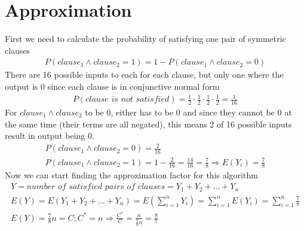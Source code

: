 \documentclass[12pt]{article}
\begin{document}
\section{Approximation}
	First we need to calculate the probability of satisfying one pair of symmetric clauses
	\begin{gather*}
	P(clause_1 \land clause_2 = 1) = 1 - P(clause_1 \land clause_2 = 0)
	\end{gather*}
	There are 16 possible inputs to each for each clause, but only one where the output is 0 since each clause is in conjunctive normal form
	\begin{gather*}
	P(\textit{clause is not satisfied}) = \frac{1}{2} \cdot \frac{1}{2} \cdot \frac{1}{2} \cdot \frac{1}{2} = \frac{1}{16}
	\end{gather*}
	For $clause_1 \land clause_2$ to be 0, either has to be 0 and since they cannot be 0 at
	the same time (their terms are all negated), this means 2 of 16 possible inputs result in output being 0.
	\begin{gather*}
	P(clause_1 \land clause_2 = 0) = \frac{2}{16}\\
	P(clause_1 \land clause_2 = 1) = 1 - \frac{2}{16} = \frac{14}{16} = \frac{7}{8} \Rightarrow E(Y_i) = \frac{7}{8}
	\end{gather*}
	Now we can start finding the approximation factor for this algorithm
	\begin{gather*}
	Y = \textit{number of satisfied pairs of clauses} = Y_1 + Y_2 + \dots + Y_n \\
	E(Y) = E(Y_1 + Y_2 + \dots + Y_n) = E(\sum_{i=1}^{n}{Y_i}) = \sum_{i=1}^{n}{E(Y_i)} = \sum_{i=1}^{n}{\frac{7}{8}}\\
	E(Y) = \frac{7}{8}n = C; C^{*} = n \Rightarrow \frac{C^{*}}{C} = \frac{n}{\frac{7}{8}n} = \frac{8}{7}
	\end{gather*}
\end{document}
